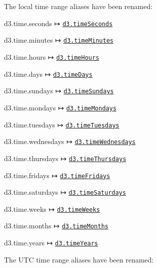 The local time range aliases have been renamed\+:


\begin{DoxyItemize}
\item d3.\+time.\+seconds ↦ \href{https://github.com/d3/d3-time/blob/master/README.md#timeSeconds}{\tt d3.\+time\+Seconds}
\item d3.\+time.\+minutes ↦ \href{https://github.com/d3/d3-time/blob/master/README.md#timeMinutes}{\tt d3.\+time\+Minutes}
\item d3.\+time.\+hours ↦ \href{https://github.com/d3/d3-time/blob/master/README.md#timeHours}{\tt d3.\+time\+Hours}
\item d3.\+time.\+days ↦ \href{https://github.com/d3/d3-time/blob/master/README.md#timeDays}{\tt d3.\+time\+Days}
\item d3.\+time.\+sundays ↦ \href{https://github.com/d3/d3-time/blob/master/README.md#timeSundays}{\tt d3.\+time\+Sundays}
\item d3.\+time.\+mondays ↦ \href{https://github.com/d3/d3-time/blob/master/README.md#timeMondays}{\tt d3.\+time\+Mondays}
\item d3.\+time.\+tuesdays ↦ \href{https://github.com/d3/d3-time/blob/master/README.md#timeTuesdays}{\tt d3.\+time\+Tuesdays}
\item d3.\+time.\+wednesdays ↦ \href{https://github.com/d3/d3-time/blob/master/README.md#timeWednesdays}{\tt d3.\+time\+Wednesdays}
\item d3.\+time.\+thursdays ↦ \href{https://github.com/d3/d3-time/blob/master/README.md#timeThursdays}{\tt d3.\+time\+Thursdays}
\item d3.\+time.\+fridays ↦ \href{https://github.com/d3/d3-time/blob/master/README.md#timeFridays}{\tt d3.\+time\+Fridays}
\item d3.\+time.\+saturdays ↦ \href{https://github.com/d3/d3-time/blob/master/README.md#timeSaturdays}{\tt d3.\+time\+Saturdays}
\item d3.\+time.\+weeks ↦ \href{https://github.com/d3/d3-time/blob/master/README.md#timeWeeks}{\tt d3.\+time\+Weeks}
\item d3.\+time.\+months ↦ \href{https://github.com/d3/d3-time/blob/master/README.md#timeMonths}{\tt d3.\+time\+Months}
\item d3.\+time.\+years ↦ \href{https://github.com/d3/d3-time/blob/master/README.md#timeYears}{\tt d3.\+time\+Years}
\end{DoxyItemize}

The U\+TC time range aliases have been renamed\+:


